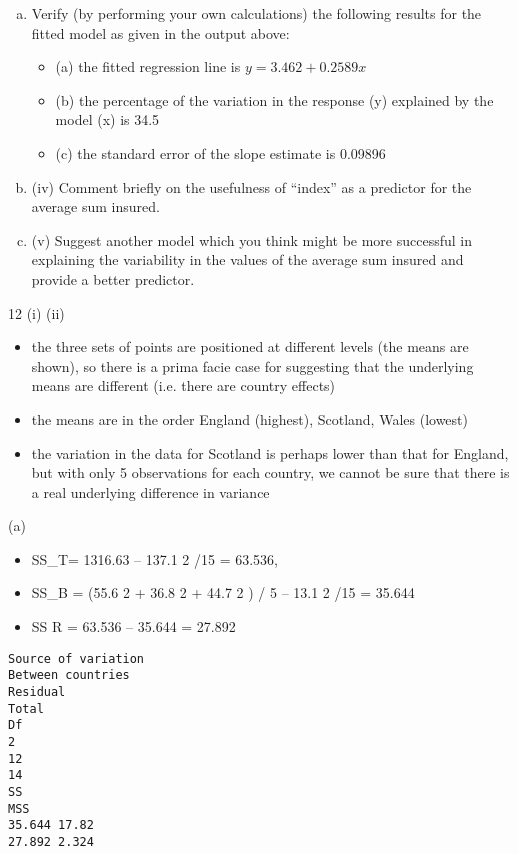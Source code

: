 \documentclass[a4paper,12pt]{article}
\begin{document}
\begin{enumerate}[(a)]
\item Verify (by performing your own calculations) the following results for the fitted model as given in the output above:
\begin{itemize}
\item (a) the fitted regression line is $y = 3.462 + 0.2589x$
\item (b) the percentage of the variation in the response (y) explained by the model (x) is 34.5%
\item (c) the standard error of the slope estimate is 0.09896
\end{itemize}
\item (iv) Comment briefly on the usefulness of “index” as a predictor for the average sum insured.
\item 
(v) Suggest another model which you think might be more successful in explaining the variability in the values of the average sum insured and provide a better predictor.
\end{enumerate}
\newpage

12
(i)
(ii)
\begin{itemize}
\item the three sets of points are positioned at different levels (the means are shown), so there is a prima facie case for suggesting that the underlying means are different (i.e. there are country effects)
\item the means are in the order England (highest), Scotland, Wales (lowest) 
\item the variation in the data for Scotland is perhaps lower than that for England, but with only 5 observations for each country, we cannot be sure that there is a real underlying difference in variance
\end{itemize}
(a)
\begin{itemize}
\item SS_{T}= 1316.63 – 137.1 2 /15 = 63.536, 
\item SS_{B} = (55.6 2 + 36.8 2 + 44.7 2 ) /
5 – 13.1 2 /15 = 35.644
\item SS R = 63.536 – 35.644 = 27.892
\end{itemize}


\begin{verbatim}
Source of variation
Between countries
Residual
Total
Df
2
12
14
SS
MSS
35.644 17.82
27.892 2.324
\end{verbatim}
\end{document}
